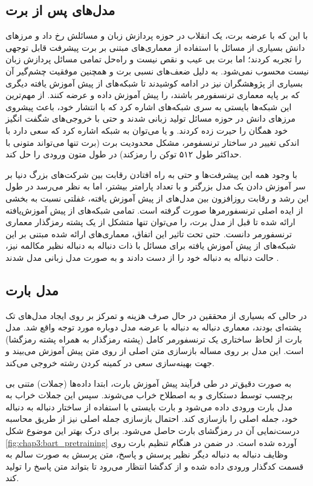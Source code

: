 \subsection{مدل‌های پس از برت}
با این که با عرضه برت، یک انقلاب در حوزه پردازش زبان و مسائلش رخ داد و مرز‌های دانش بسیاری از مسائل با استفاده از معماری‌های مبتنی بر برت پیشرفت قابل توجهی را تجربه کردند؛ اما برت بی عیب و نقص نیست و راه‌حل تمامی مسائل پردازش زبان نیست محسوب نمی‌شود. به دلیل ضعف‌های نسبی برت و همچنین موفقیت چشم‌گیر آن بسیاری از پژوهشگران نیز در ادامه کوشیدند تا شبکه‌های از پیش آموزش یافته دیگری که بر پایه معماری ترنسفورمر باشند، را پیش آموزش داده و عرضه کنند.
از مهم‌ترین این شبکه‌ها بایستی به سری شبکه‌های 
اشاره کرد که با انتشار خود، باعث پیشروی مرز‌های دانش در حوزه مسائل تولید زبانی شدند و حتی با خروجی‌های شگفت انگیز خود همگان را حیرت زده کردند.
و یا می‌توان به شبکه
اشاره کرد که سعی دارد با اندکی تغییر در ساختار ترنسفومر، مشکل محدودیت برت 
(برت تنها می‌تواند متونی با حداکثر طول ۵۱۲ توکن را رمزکند)
در طول متون ورودی را حل کند. 

با وجود همه این پیشرفت‌ها و حتی به راه افتادن رقابت بین شرکت‌های بزرگ دنیا بر سر آموزش دادن یک مدل بزرگتر و با تعداد پارامتر بیشتر، اما به نظر می‌رسد در طول این رشد و رقابت روزافزون بین مدل‌های از پیش آموزش یافته، غفلتی نسبت به بخشی از ایده اصلی ترنسفورمر‌ها صورت گرفته است. تمامی شبکه‌های از پیش آموز‌ش‌یافته ارائه شده تا قبل از مدل برت، را می‌توان تنها متشکل از یک پشته رمزگذار معماری ترنسفورمر دانست. حتی تحت تاثیر این اتفاق، معماری‌های ارائه شده مبتنی بر این شبکه‌های از پیش آموزش یافته برای مسائل با ذات دنباله به دنباله نظیر مکالمه نیز، حالت دنباله به دنباله خود را از دست دادند و به صورت مدل زبانی مدل شدند
\cite{zhang2019dialogpt}.


\subsection{مدل بارت}
در حالی که بسیاری از محققین در حال صرف هزینه و تمرکز بر روی ایجاد مدل‌های تک پشته‌ای بودند، معماری دنباله به دنباله با عرضه مدل 
دوباره مورد توجه واقع شد. مدل بارت از لحاظ ساختاری یک ترنسفورمر کامل (پشته رمزگذار به همراه پشته رمزگشا) است. این مدل بر روی مساله بازسازی متن اصلی از روی متن 
پیش آموزش می‌بیند و جهت بهینه‌سازی سعی در کمینه‌ کردن 
رشته خروجی می‌کند.
 
 به صورت دقیق‌تر در طی فرآیند پیش‌‌‌ آموزش بارت، ابتدا داده‌‌ها (جملات) متنی بی برچسب توسط 
دستکاری و به اصطلاح خراب می‌شوند. سپس این جملات خراب به مدل بارت ورودی داده می‌شود و بارت بایستی با استفاده از ساختار دنباله به دنباله خود، جمله اصلی را بازسازی کند. احتمال بازسازی جمله اصلی نیز از طریق محاسبه درست‌نمایی آن در رمزگشای بارت حاصل می‌شود. برای درک بهتر این موضوع شکل
\ref{fig:chap3:bart_pretraining}
آورده شده است. در ضمن در هنگام تنظیم بارت روی وظایف دنباله به دنباله دیگر نظیر پرسش و پاسخ، متن پرسش به صورت سالم به قسمت کدگذار ورودی داده شده و از کدگشا انتظار می‌رود تا بتواند متن پاسخ را تولید کند.

